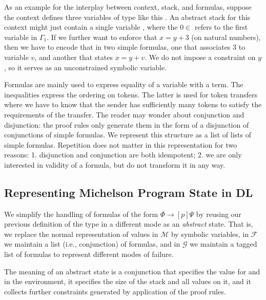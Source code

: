 As an example for the interplay between context, stack, and formulas,
suppose the context defines three variables of type 
 like this {\ExamplesContext}. An abstract stack for this
context might just contain a single variable {\ExamplesXZero}, where
the $0\in$ refers to the first variable in $\Gamma_1$.
\ExamplesAStack
If we further
want to enforce that $x = y + 3$ (on natural numbers), then we have to
encode that in two simple formulas, one that associates $3$ to
variable $v$, and another that states $x = y + v$. We do not impose a
constraint on $y$, so it serves as an unconstrained symbolic variable.
\ExamplesEqnPlus

Formulas are mainly used to express equality of a variable with a
term. The inequalities express the ordering on tokens. The latter is used for token transfers
where we have to know that the sender has sufficiently many tokens to satisfy
the requirements of the transfer. The reader may wonder about 
conjunction and disjunction: the proof rules only generate them in the
form of a disjunction of conjunctions of simple formulas.  We
represent this structure as a list of lists of simple
formulas. Repetition does not matter in this
representation for two reasons: 1. disjunction and conjunction are
both idempotent; 2. we are only interested in validity of a formula,
but do not transform it in any way.


\subsection{Representing Michelson Program State in DL}
\label{sec:abstract-states}

We simplify the handling of formulas of the form $\Phi \to [p]\Psi$ by
reusing our previous definition of the type  in a
different mode as an \emph{abstract} state.
\AbstractAMode
That is, we replace the normal representation of values in $\mathcal M$ by symbolic
variables, in $\mathcal{F}$ we maintain a list (i.e., conjunction) of
formulas, and in $\mathcal{G}$ we maintain a tagged list of formulas
to represent different modes of failure. 

The meaning of an abstract state is a conjunction that specifies the
value for  and  in the environment, it
specifies the size of the stack and all values on it, and it collects
further constraints generated by application of the proof rules.




